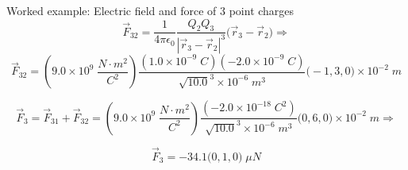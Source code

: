 {\begin{frame}{Worked example: Electric field and force of 3 point charges}
\begin{equation*}
  \vec{F}_{32} = \frac{1}{4\pi \epsilon_0} \frac{Q_2 Q_3}{|\vec{r}_3-\vec{r}_2|^3} \Big( \vec{r}_3-\vec{r}_2 \Big) \Rightarrow
\end{equation*}
\begin{equation*}
  \vec{F}_{32} = (9.0 \times 10^9 \; \frac{N \cdot m^2}{C^2})
     \frac{(1.0 \times 10^{-9} \; C)(-2.0 \times 10^{-9} \; C)}{\sqrt{10.0}^3 \times 10^{-6} \; m^3} \Big(-1,3,0\Big) \times 10^{-2} \; m
\end{equation*}

\begin{equation*}
  \vec{F}_3 =
  \vec{F}_{31} + \vec{F}_{32} = (9.0 \times 10^9 \; \frac{N \cdot m^2}{C^2})
     \frac{(-2.0 \times 10^{-18} \; C^2)}{\sqrt{10.0}^3 \times 10^{-6} \; m^3} \Big(0,6,0\Big) \times 10^{-2} \; m \Rightarrow
\end{equation*}

\begin{equation*}
  \vec{F}_{3} = -34.1 \Big(0,1,0\Big) \; {\mu}N
\end{equation*}

\end{frame}

} %



%
%

